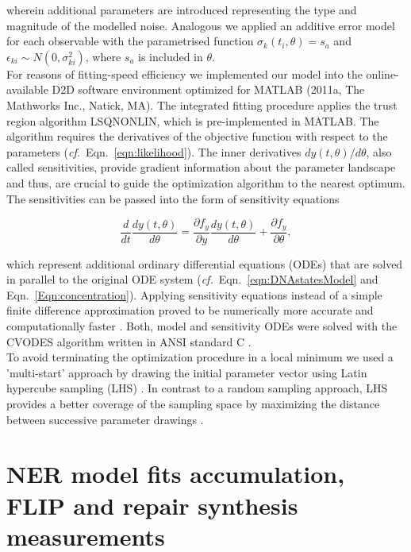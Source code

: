 wherein additional parameters are introduced representing the type and magnitude of the modelled noise. Analogous we applied an additive error model for each observable with the parametrised function $\sigma_{k}(t_i,\theta) = s_a$ and $\epsilon_{ki} \sim N(0,\sigma_{ki}^2)$, where $s_a$ is included in $\theta$.\\ 
For reasons of fitting-speed efficiency we implemented our model into the online-available D2D software environment \cite{Raue2013} optimized for MATLAB (2011a, The Mathworks Inc., Natick, MA). The integrated fitting procedure applies the trust region algorithm LSQNONLIN, which is pre-implemented in MATLAB. The algorithm requires the derivatives of the objective function with respect to the parameters (\textit{cf.}\ Eqn.\ \ref{eqn:likelihood}). The inner derivatives $dy(t,\theta)/d\theta$, also called sensitivities, provide gradient information about the parameter landscape and thus, are crucial to guide the optimization algorithm to the nearest optimum. The sensitivities can be passed into the form of sensitivity equations 

\begin{equation}
	\frac{d}{dt}\frac{dy(t,\theta)}{d\theta} = \frac{\partial f_y}{\partial y}\frac{dy(t,\theta)}{d\theta}+\frac{\partial f_y}{\partial \theta},
\end{equation}  

which represent additional ordinary differential equations (ODEs) \label{sec:ODE} that are solved in parallel to the original ODE system (\textit{cf.}\ Eqn.\ \ref{eqn:DNAstatesModel} and Eqn.\ \ref{Eqn:concentration})\cite{Leis1988}. Applying sensitivity equations instead of a simple finite difference approximation proved to be numerically more accurate and computationally faster \cite{Raue2013}. Both, model and sensitivity ODEs were solved with the CVODES algorithm written in ANSI \label{sec:ANSI} standard C \cite{Hindmarsh2005}. \\
To avoid terminating the optimization procedure in a local minimum we used a 'multi-start' approach by drawing the initial parameter vector using Latin hypercube sampling (LHS) \cite{Owen2014}. In contrast to a random sampling approach, LHS provides a better coverage of the sampling space by maximizing the distance between successive parameter drawings \cite{Raue2013}.    





\section{NER model fits accumulation, FLIP and repair synthesis measurements}    

